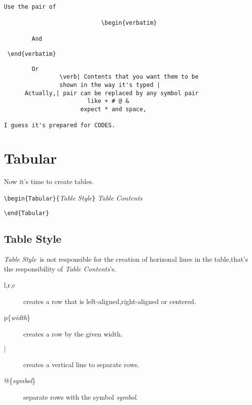 \begin{verbatim}

Use the pair of

                            \begin{verbatim}

        And
\end{verbatim}

\verb| \end{verbatim}|

\begin{verbatim}
        Or
                \verb| Contents that you want them to be
                shown in the way it's typed |
      Actually,| pair can be replaced by any symbol pair
                        like + # @ &
                      expect * and space,
                      
I guess it's prepared for CODES.

\end{verbatim}

\section{Tabular}

Now it's time to create tables.

\verb|\begin{Tabular}{|\emph{Table Style}\verb|}|
\emph{Table Contents}

\verb|\end{Tabular}|

\subsection{Table Style}

\emph{Table Style}\ is not responsible for the creation of horizonal
lines in the table,that's the responsibility of \emph{Table
Contents}'s.

\begin{description}

\item[l,r,c] creates a row that is left-aligned,right-aligned or
centered.

\item[p\{\emph{width}\}] creates a row by the given width.

\item[$|$] creates a vertical line to separate rows.

\item[@\{\emph{symbol}\}]separate rows with the symbol
\emph{symbol}.

\end{description}

